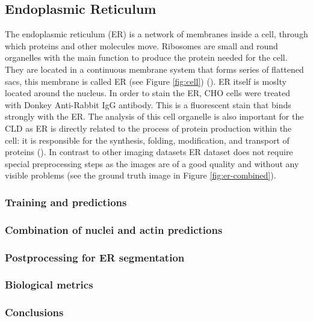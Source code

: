 \subsection{Endoplasmic Reticulum}
    \label{section:er}
    The endoplasmic reticulum (ER) is a network of membranes inside a cell, through which proteins and other molecules move. Ribosomes are small and round organelles with the main function to produce the protein needed for the cell. They are located in a continuous membrane system that forms series of flattened sacs, this membrane is called ER (see Figure \ref{fig:cell}) (\cite{er}). ER itself is moslty located around the nucleus. In order to stain the ER, CHO cells were treated with Donkey Anti-Rabbit IgG antibody. This is a fluorescent stain that binds strongly with the ER. The analysis of this cell organelle is also important for the CLD as ER is directly related to the process of protein production within the cell: it is responsible for the synthesis, folding, modification, and transport of proteins (\cite{er_2}). In contrast to other imaging datasets ER dataset does not require special preprocessing steps as the images are of a good quality and without any visible problems (see the ground truth image in Figure \ref{fig:er-combined}).
    
    \subsubsection{Training and predictions}
        
    \subsubsection{Combination of nuclei and actin predictions}
        
    \subsubsection{Postprocessing for ER segmentation}
        
    \subsubsection{Biological metrics}
        
    \subsubsection{Conclusions}
        
    